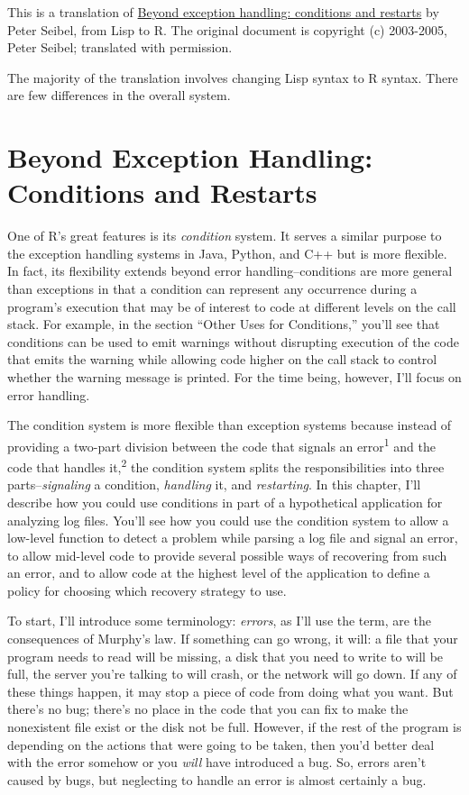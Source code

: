This is a translation of
\href{http://www.gigamonkeys.com/book/beyond-exception-handling-conditions-and-restarts.html}{Beyond
exception handling: conditions and restarts} by Peter Seibel, from Lisp
to R. The original document is copyright (c) 2003-2005, Peter Seibel;
translated with permission.

The majority of the translation involves changing Lisp syntax to R
syntax. There are few differences in the overall system.

\chapter{Beyond Exception Handling: Conditions and Restarts}

One of R's great features is its \emph{condition} system. It serves a
similar purpose to the exception handling systems in Java, Python, and
C++ but is more flexible. In fact, its flexibility extends beyond error
handling--conditions are more general than exceptions in that a
condition can represent any occurrence during a program's execution that
may be of interest to code at different levels on the call stack. For
example, in the section ``Other Uses for Conditions,'' you'll see that
conditions can be used to emit warnings without disrupting execution of
the code that emits the warning while allowing code higher on the call
stack to control whether the warning message is printed. For the time
being, however, I'll focus on error handling.

The condition system is more flexible than exception systems because
instead of providing a two-part division between the code that signals
an error\textsuperscript{1} and the code that handles
it,\textsuperscript{2} the condition system splits the responsibilities
into three parts--\emph{signaling} a condition, \emph{handling} it, and
\emph{restarting}. In this chapter, I'll describe how you could use
conditions in part of a hypothetical application for analyzing log
files. You'll see how you could use the condition system to allow a
low-level function to detect a problem while parsing a log file and
signal an error, to allow mid-level code to provide several possible
ways of recovering from such an error, and to allow code at the highest
level of the application to define a policy for choosing which recovery
strategy to use.

To start, I'll introduce some terminology: \emph{errors}, as I'll use
the term, are the consequences of Murphy's law. If something can go
wrong, it will: a file that your program needs to read will be missing,
a disk that you need to write to will be full, the server you're talking
to will crash, or the network will go down. If any of these things
happen, it may stop a piece of code from doing what you want. But
there's no bug; there's no place in the code that you can fix to make
the nonexistent file exist or the disk not be full. However, if the rest
of the program is depending on the actions that were going to be taken,
then you'd better deal with the error somehow or you \emph{will} have
introduced a bug. So, errors aren't caused by bugs, but neglecting to
handle an error is almost certainly a bug.

